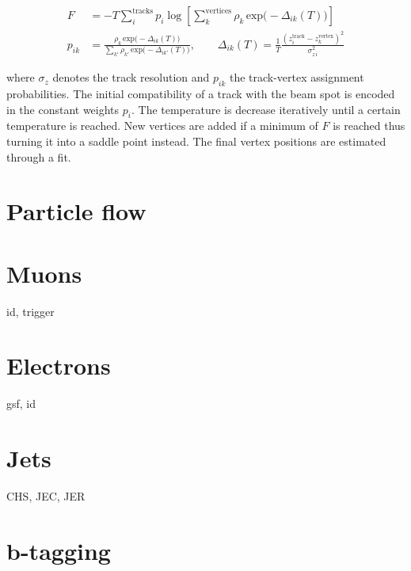 \begin{align}
F&=-T\sum_{i}^\mathrm{tracks}p_{i}\log\left[\sum_{k}^\mathrm{vertices}\rho_{k}\,\mathrm{exp}\big(-\Delta_{ik}(T)\big)\right]\\
p_{ik}&=\frac{\rho_{k}\,\mathrm{exp}\big(-\Delta_{ik}(T)\big)}{\sum_{k\prime}\rho_{k\prime}\,\mathrm{exp}\big(-\Delta_{ik\prime}(T)\big)},\qquad\Delta_{ik}(T)=\frac{1}{T}\frac{(z_{i}^\mathrm{track}-z_{k}^\mathrm{vertex})^2}{\sigma_{z\,i}^{2}}
\end{align}

where $\sigma_{z}$ denotes the track resolution and $p_{ik}$ the track-vertex assignment probabilities. The initial compatibility of a track with the beam spot is encoded in the constant weights $p_{i}$. The temperature is decrease iteratively until a certain temperature is reached. New vertices are added if a minimum of $F$ is reached thus turning it into a saddle point instead. The final vertex positions are estimated through a fit.




\section{Particle flow}

\section{Muons}

id, trigger

\section{Electrons}
\label{sec:reconstruction-electrons}

gsf, id

\section{Jets}

CHS, JEC, JER

\section{b-tagging}

